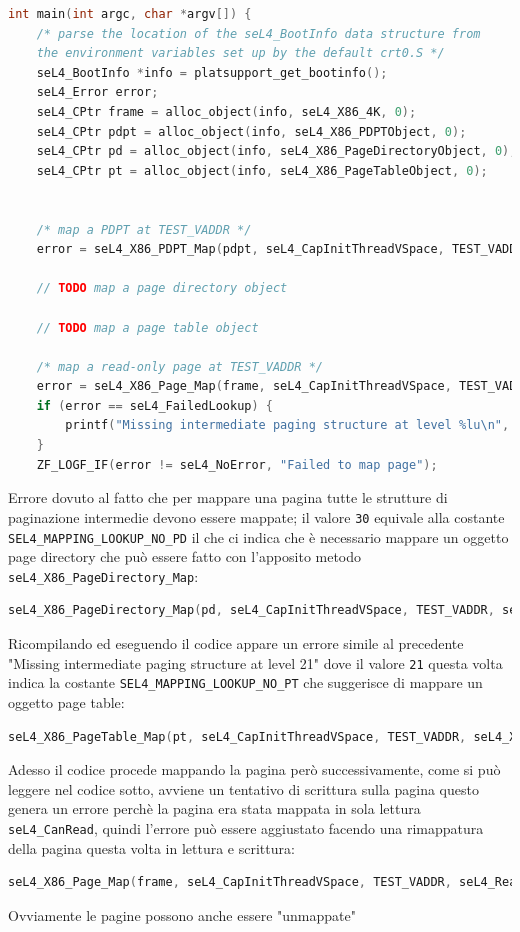 \begin{lstlisting}[language=C++]
int main(int argc, char *argv[]) {
    /* parse the location of the seL4_BootInfo data structure from
    the environment variables set up by the default crt0.S */
    seL4_BootInfo *info = platsupport_get_bootinfo();
    seL4_Error error;
    seL4_CPtr frame = alloc_object(info, seL4_X86_4K, 0);
    seL4_CPtr pdpt = alloc_object(info, seL4_X86_PDPTObject, 0);
    seL4_CPtr pd = alloc_object(info, seL4_X86_PageDirectoryObject, 0);
    seL4_CPtr pt = alloc_object(info, seL4_X86_PageTableObject, 0);


    /* map a PDPT at TEST_VADDR */
    error = seL4_X86_PDPT_Map(pdpt, seL4_CapInitThreadVSpace, TEST_VADDR, seL4_X86_Default_VMAttributes);

    // TODO map a page directory object

    // TODO map a page table object

    /* map a read-only page at TEST_VADDR */
    error = seL4_X86_Page_Map(frame, seL4_CapInitThreadVSpace, TEST_VADDR, seL4_CanRead, seL4_X86_Default_VMAttributes);
    if (error == seL4_FailedLookup) {
        printf("Missing intermediate paging structure at level %lu\n", seL4_MappingFailedLookupLevel());
    }
    ZF_LOGF_IF(error != seL4_NoError, "Failed to map page");
\end{lstlisting}
Errore dovuto al fatto che per mappare una pagina tutte le strutture di paginazione intermedie devono essere mappate; il valore \texttt{30} equivale alla costante \texttt{SEL4\_MAPPING\_LOOKUP\_NO\_PD} il che ci indica che è necessario mappare un oggetto page directory che può essere fatto con l'apposito metodo \texttt{seL4\_X86\_PageDirectory\_Map}:
\begin{lstlisting}[language=C++]
seL4_X86_PageDirectory_Map(pd, seL4_CapInitThreadVSpace, TEST_VADDR, seL4_X86_Default_VMAttributes);
\end{lstlisting}
Ricompilando ed eseguendo il codice appare un errore simile al precedente "Missing intermediate paging structure at level 21" dove il valore \texttt{21} questa volta indica la costante \texttt{SEL4\_MAPPING\_LOOKUP\_NO\_PT} che suggerisce di mappare un oggetto page table:
\begin{lstlisting}[language=C++]
seL4_X86_PageTable_Map(pt, seL4_CapInitThreadVSpace, TEST_VADDR, seL4_X86_Default_VMAttributes);
\end{lstlisting}
Adesso il codice procede mappando la pagina però successivamente, come si può leggere nel codice sotto, avviene un tentativo di scrittura sulla pagina questo genera un errore perchè la pagina era stata mappata in sola lettura \texttt{seL4\_CanRead}, quindi l'errore può essere aggiustato facendo una rimappatura della pagina questa volta in lettura e scrittura:
\begin{lstlisting}[language=C++]
seL4_X86_Page_Map(frame, seL4_CapInitThreadVSpace, TEST_VADDR, seL4_ReadWrite, seL4_X86_Default_VMAttributes);
\end{lstlisting}
Ovviamente le pagine possono anche essere "unmappate"